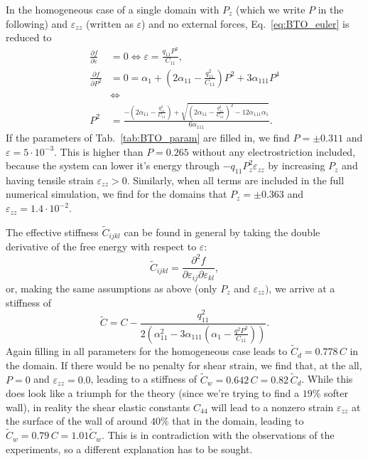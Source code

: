In the homogeneous case of a single domain with $P_z$ (which we write $P$ in the following) and $\varepsilon_{zz}$ (written as $\varepsilon$) and no external forces, Eq.~\ref{eq:BTO_euler} is reduced to  
\begin{align}
	\frac{\partial f}{\partial \varepsilon} &= 0 \Leftrightarrow \varepsilon = \frac{q_{11}P^2}{C_{11}}\label{eq:BTO_e0},\\
	\frac{\partial f}{\partial P^2} &= 0 = \alpha_1 + (2 \alpha_{11} - \frac{q_{11}^2}{C_{11}})P^2 + 3\alpha_{111}P^4 \\
	& \Leftrightarrow \\
	P^2 &= \frac{-(2\alpha_{11} - \frac{q_{11}^2}{C_{11}}) + \sqrt{(2\alpha_{11}-\frac{q_{11}^2}{C_{11}})^2 - 12 \alpha_{111} \alpha_1}}{6\alpha_{111}}.
\end{align}
If the parameters of Tab.~\ref{tab:BTO_param} are filled in, we find $P = \pm 0.311$ and $\varepsilon = 5 \cdot 10^{-3}$.
This is higher than $P = 0.265$ \cite{Marton2010} without any electrostriction included, because the system can lower it's energy through $-q_{11}P_z^2\varepsilon_{zz}$ by increasing $P_z$ and having tensile strain $\varepsilon_{zz} > 0$.
Similarly, when all terms are included in the full numerical simulation, we find for the domains that $P_z = \pm 0.363$ and $\varepsilon_{zz} = 1.4 \cdot 10^{-2}$.

The effective stiffness $\tilde{C}_{ijkl}$ can be found in general by taking the double derivative of the free energy with respect to $\varepsilon$:
\begin{equation}
	\tilde{C}_{ijkl} = \frac{\partial^2 f}{\partial \varepsilon_{ij} \partial \varepsilon_{kl}},
\end{equation}
or, making the same assumptions as above (only $P_z$ and $\varepsilon_{zz})$, we arrive at a stiffness of
\begin{equation}
	\tilde{C} = C - \frac{q_{11}^2}{2\left(\alpha_{11}^2 - 3 \alpha_{111}\left(\alpha_1  - \frac{q^2 P^2}{C_{11}}\right)\right)}\label{eq:BTO_domainC}.
\end{equation}
Again filling in all parameters for the homogeneous case leads to $\tilde{C}_d = 0.778 \,C$ in the domain.
If there would be no penalty for shear strain, we find that, at the all, $P = 0$ and $\varepsilon_{zz} = 0.0$, leading to a stiffness of $\tilde{C}_w = 0.642 \, C = 0.82\, \tilde{C}_d$.
While this does look like a triumph for the theory (since we're trying to find a $19\%$ softer wall), in reality the shear elastic constants $C_{44}$  will lead to a nonzero strain $\varepsilon_{zz}$ at the surface of the wall of around $40\%$ that in the domain, leading to $\tilde{C}_w = 0.79 \, C = 1.01 \tilde{C}_w$. 
This is in contradiction with the observations of the experiments, so a different explanation has to be sought.

